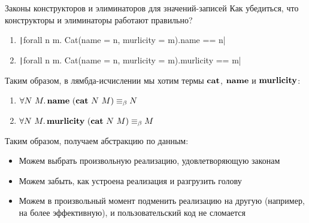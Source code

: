     \begin{frame}[fragile]{Законы конструкторов и элиминаторов для значений-записей}
        Как убедиться, что конструкторы и элиминаторы работают правильно?
        \pause
        \begin{enumerate}
            \item \texttt|forall n m. Cat(name = n, murlicity = m).name == n|
            \item \texttt|forall n m. Cat(name = n, murlicity = m).murlicity == m|
        \end{enumerate}
        \pause
        \vspace{1em}
        Таким образом, в лямбда-исчислении мы хотим \pause термы $\mathbf{cat}$, $\mathbf{name}$ и $\mathbf{murlicity}$:
        \begin{enumerate}
            \item $\forall N~M\ldotp \mathbf{name}~(\mathbf{cat}~N~M) \equiv_\beta N$
            \item $\forall N~M\ldotp \mathbf{murlicity}~(\mathbf{cat}~N~M) \equiv_\beta M$
        \end{enumerate}
        \pause
        \vspace{1em}
        Таким образом, получаем абстракцию по данным:
        \begin{itemize}
            \item Можем выбрать произвольную реализацию, удовлетворяющую законам
            \item Можем забыть, как устроена реализация и разгрузить голову
            \item Можем в произвольный момент подменить реализацию на другую (например, на более эффективную), и пользовательский код не сломается
        \end{itemize}
    \end{frame}

